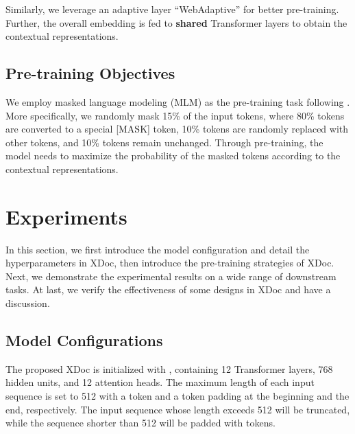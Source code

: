 \documentclass[11pt]{article}
\begin{document}
Similarly, we leverage an adaptive layer ``WebAdaptive'' for better pre-training. Further, the overall embedding is fed to \textbf{shared} Transformer layers to obtain the contextual representations. 

\subsection{Pre-training Objectives}

We employ masked language modeling (MLM) as the pre-training task following \cite{devlin2018bert,liu2019roberta,xu2020layoutlm}. More specifically, we randomly mask 15\% of the input tokens, where 80\% tokens are converted to a special [MASK] token, 10\% tokens are randomly replaced with other tokens, and 10\% tokens remain unchanged. Through pre-training, the model needs to maximize the probability of the masked tokens according to the contextual representations.


\section{Experiments}
In this section, we first introduce the model configuration and detail the hyperparameters in XDoc, then introduce the pre-training strategies of XDoc. Next, we demonstrate the experimental results on a wide range of downstream tasks. At last, we verify the effectiveness of some designs in XDoc and have a discussion.

\subsection{Model Configurations}
The proposed XDoc is initialized with , containing 12 Transformer layers, 768 hidden units, and 12 attention heads. The maximum length of each input sequence is set to 512 with a  token and a  token padding at the beginning and the end, respectively. The input sequence whose length exceeds 512 will be truncated, while the sequence shorter than 512 will be padded with  tokens.
\end{document}
